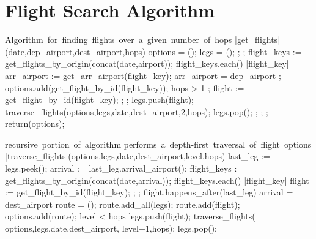 \documentclass[twocolumn]{article}
\begin{document}
\section{Flight Search Algorithm}\label{apx:flightSearchAlgorithm}
\begin{@twocolumnfalse}
\begin{program}
\BEGIN %
  \mbox{Algorithm for finding flights over a given number of hops}
  \PROC |get_flights|(date,dep\_airport,dest\_airport,hops) \BODY
    options = ();
    legs = ();
    ;
    ;
    flight\_keys := get\_flights\_by\_origin(concat(date,airport));
    \FOR flight\_keys.each() \Rightarrow |flight\_key| \DO
      arr\_airport := get\_arr\_airport(flight\_key);
      \IF arr\_airport = dep\_airport
        ;
        options.add(get\_flight\_by\_id(flight\_key));
      \ELSIF hops > 1
        ;
        flight := get\_flight\_by\_id(flight\_key);
        ;
        ;
        legs.push(flight);
        traverse\_flights(options,legs,date,dest\_airport,2,hops);
        legs.pop();
      \FI
    \OD
    ;
    ;
    ;
    return(options);
  \ENDPROC
  
  \mbox{recursive portion of algorithm}
  \mbox{performs a depth-first traversal of flight options}
  \PROC |traverse\_flights|(options,legs,date,dest\_airport,level,hops) \BODY
    last\_leg := legs.peek();
    arrival := last\_leg.arrival\_airport();
    flight\_keys := get\_flights\_by\_origin(concat(date,arrival));    
    \FOR flight\_keys.each() \Rightarrow |flight\_key| \DO
      flight := get\_flight\_by\_id(flight\_key);
      ;
      ;
      \IF flight.happens\_after(last\_leg)
        \IF arrival = dest\_airport
          route = ();
          route.add\_all(legs);
          route.add(flight);
          options.add(route);
        \ELSE
          \IF level < hops
          legs.push(flight);
          traverse\_flights(
            options,legs,date,dest\_airport,
            level+1,hops);
          legs.pop();
          \FI
        \FI
      \FI
    \OD
  \ENDPROC
\END
\end{program}


\end{@twocolumnfalse}
\end{document}
